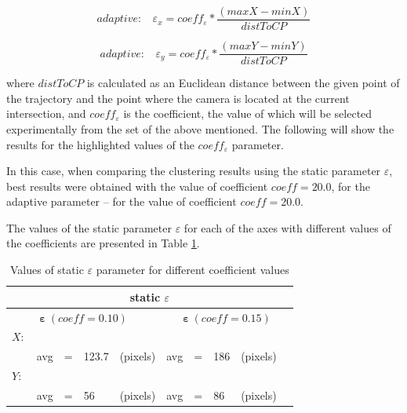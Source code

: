 \begin{equation} \label{eq:epsX-adapt}
	adaptive:\ \ \ \ \varepsilon_x = coeff_\varepsilon * \frac{(maxX - minX)}{distToCP}
\end{equation}

\begin{equation} \label{eq:epsY-adapt}
	adaptive:\ \ \ \ \varepsilon_y = coeff_\varepsilon * \frac{(maxY - minY)}{distToCP}
\end{equation}

where $distToCP$ is calculated as an Euclidean distance between the given point of the trajectory and the point where the camera is located at the current intersection, and $coeff_\varepsilon$ is the coefficient, the value of which will be selected experimentally from the set of the above mentioned. The following will show the results for the highlighted values of the $coeff_\varepsilon$ parameter.

In this case, when comparing the clustering results using the static parameter $\varepsilon$, best results were obtained with the value of coefficient $coeff = 20.0$, for the adaptive parameter -- for the value of coefficient $coeff = 20.0$.

The values of the static parameter $\varepsilon$ for each of the axes with different values of the coefficients are presented in Table \ref{table:eps_st}.

\begin{table}[htb!]
	\caption{Values of static $\varepsilon$ parameter for different coefficient values}
	\label{table:eps_st}
	
	\setlength{\tabcolsep}{10pt}
	\centering
	
	\begin{tabular}
		{||lllll|lllll||}
		\multicolumn{10}{c}{static $\varepsilon$} \\[0.5ex]
		\hline
		\multicolumn{5}{||c}{$\bm{\varepsilon}\ (coeff = 0.10)$} & \multicolumn{5}{c||}{$\bm{\varepsilon}\ (coeff = 0.15)$} \\[0.5ex]
		$X:$       			& & & & & & & & & \\[0.5ex]
		& avg 	& = 	& 123.7 	& (pixels) & avg 	& = 	& 186 	& (pixels) &\\[0.5ex]
		$Y:$       			& & & & & & & & & \\[0.5ex]
		& avg 	& = 	& 56	 	& (pixels) & avg 	& = 	& 86 	& (pixels) &\\[0.5ex]
		\hline
	\end{tabular}
\end{table}

